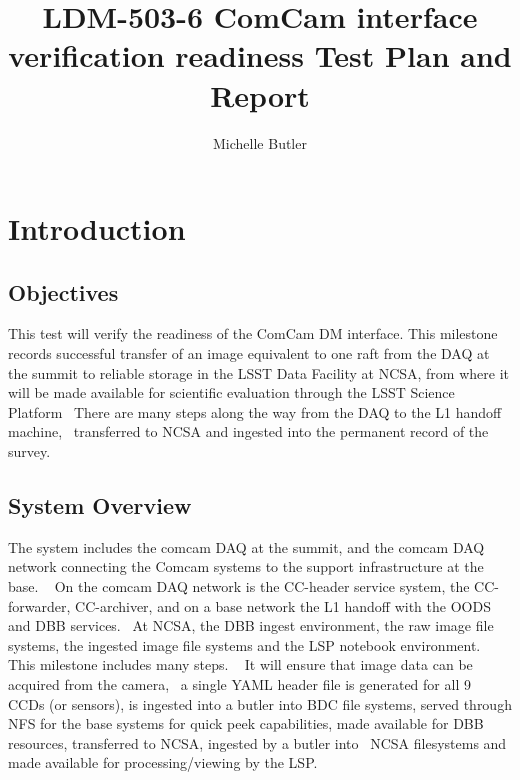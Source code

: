 \documentclass[DM,lsstdraft,STR,toc]{lsstdoc}
\begin{document}
\def\milestoneName{ComCam interface verification readiness}
\def\milestoneId{LDM-503-6}
\def\product{Data Management}


\title{ LDM-503-6 ComCam interface verification readiness Test Plan and Report}
\setDocRef{\lsstDocType-\lsstDocNum}
\date{\vcsdate}
\author{ Michelle Butler }






\maketitle

\section{Introduction}
\label{sect:intro}


\subsection{Objectives}
\label{sect:objectives}

This test will verify the readiness of the ComCam DM interface. This
milestone records successful transfer of an image equivalent to one raft
from the DAQ at the summit to reliable storage in the LSST Data Facility
at NCSA, from where it will be made available for scientific evaluation
through the LSST Science Platform ~There are many steps along the way
from the DAQ to the L1 handoff machine, ~transferred to NCSA and
ingested into the permanent record of the survey. ~~



\subsection{System Overview}
\label{sect:systemoverview}

The system includes the comcam DAQ at the summit, and the comcam DAQ
network connecting the Comcam systems to the support infrastructure at
the base. ~ On the comcam DAQ network is the CC-header service system,
the CC-forwarder, CC-archiver, and on a base network the L1 handoff with
the OODS and DBB services. ~At NCSA, the DBB ingest environment, the raw
image file systems, the ingested image file systems and the LSP notebook
environment. ~ This milestone includes many steps. ~ It will ensure that
image data can be acquired from the camera, ~a single YAML header file
is generated for all 9 CCDs (or sensors), is ingested into a butler into
BDC file systems, served through NFS for the base systems for quick peek
capabilities, made available for DBB resources, transferred to NCSA,
ingested by a butler into ~NCSA filesystems and made available for
processing/viewing by the LSP. ~\\[2\baselineskip]
\end{document}
